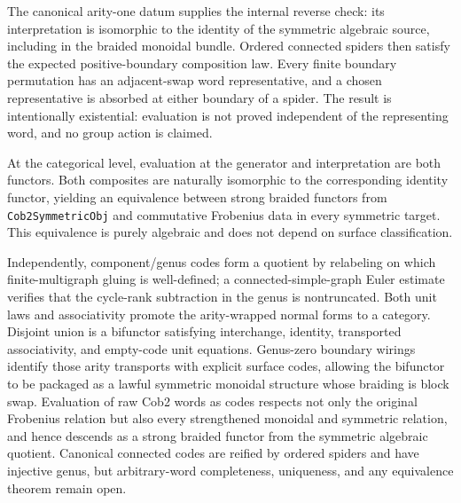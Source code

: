 \documentclass[11pt]{amsart}
\theoremstyle{plain}
\theoremstyle{definition}
\begin{document}
The canonical arity-one datum supplies the internal reverse check: its interpretation is isomorphic to the identity of the symmetric algebraic source, including in the braided monoidal bundle. Ordered connected spiders then satisfy the expected positive-boundary composition law. Every finite boundary permutation has an adjacent-swap word representative, and a chosen representative is absorbed at either boundary of a spider. The result is intentionally existential: evaluation is not proved independent of the representing word, and no group action is claimed.

At the categorical level, evaluation at the generator and interpretation are both functors. Both composites are naturally isomorphic to the corresponding identity functor, yielding an equivalence between strong braided functors from \texttt{Cob2SymmetricObj} and commutative Frobenius data in every symmetric target. This equivalence is purely algebraic and does not depend on surface classification.

Independently, component/genus codes form a quotient by relabeling on which finite-multigraph gluing is well-defined; a connected-simple-graph Euler estimate verifies that the cycle-rank subtraction in the genus is nontruncated. Both unit laws and associativity promote the arity-wrapped normal forms to a category. Disjoint union is a bifunctor satisfying interchange, identity, transported associativity, and empty-code unit equations. Genus-zero boundary wirings identify those arity transports with explicit surface codes, allowing the bifunctor to be packaged as a lawful symmetric monoidal structure whose braiding is block swap. Evaluation of raw Cob2 words as codes respects not only the original Frobenius relation but also every strengthened monoidal and symmetric relation, and hence descends as a strong braided functor from the symmetric algebraic quotient. Canonical connected codes are reified by ordered spiders and have injective genus, but arbitrary-word completeness, uniqueness, and any equivalence theorem remain open.
\end{document}
